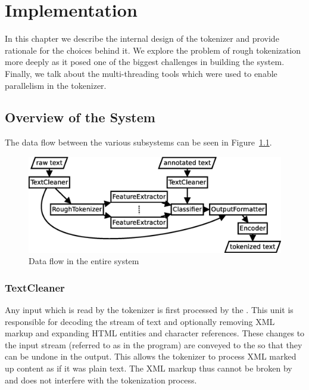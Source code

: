 \chapter{Implementation}
\label{chap:impl}

In this chapter we describe the internal design of the tokenizer and provide
rationale for the choices behind it. We explore the problem of rough
tokenization more deeply as it posed one of the biggest challenges in building
the system. Finally, we talk about the multi-threading tools which were used to
enable parallelism in the tokenizer.


\section{Overview of the System}
\label{sec:impl-overview}

The data flow between the various subsystems can be seen in
Figure~\ref{fig:all-parts}.

\begin{figure}
  \begin{center}
    \includegraphics[width=\textwidth]{img/all-parts.eps}
    \caption{Data flow in the entire system}
    \label{fig:all-parts}
  \end{center}
\end{figure}

\subsection{TextCleaner}
\label{ssec:impl-overview-textcleaner}

Any input which is read by the tokenizer is first processed by the
. This unit is responsible for decoding the stream of text
and optionally removing XML markup and expanding HTML entities and character
references. These changes to the input stream (referred to as 
in the program) are conveyed to the  so that they can be
undone in the output. This allows the tokenizer to process XML marked up
content as if it was plain text. The XML markup thus cannot be broken by and
does not interfere with the tokenization process.

